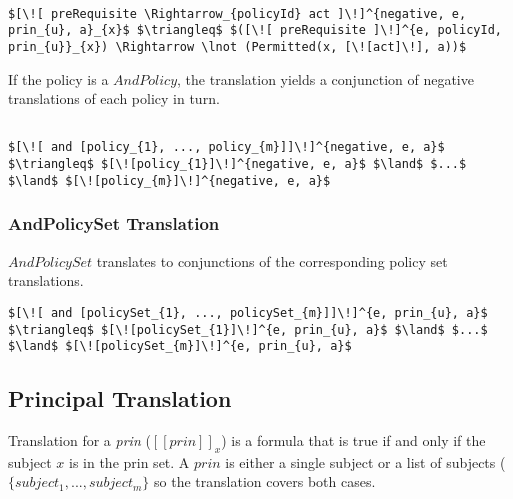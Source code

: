 \lstset{mathescape, language=AST}  
\begin{lstlisting}[frame=single, caption={Negative Policy Translation {$\colon$} Single policy},label={lst:transpolicynegativeSingle}]

$[\![ preRequisite \Rightarrow_{policyId} act ]\!]^{negative, e, prin_{u}, a}_{x}$ $\triangleq$ $([\![ preRequisite ]\!]^{e, policyId, prin_{u}}_{x}) \Rightarrow \lnot (Permitted(x, [\![act]\!], a))$
\end{lstlisting}

If the policy is a $AndPolicy$, the translation yields a conjunction of negative translations of each policy in turn.

\lstset{mathescape, language=AST}  
\begin{lstlisting}[frame=single, caption={Negative Policy Translation {$\colon$} List of policies},label={lst:transpolicynegativeListOfPolicies}]

$[\![ and [policy_{1}, ..., policy_{m}]]\!]^{negative, e, a}$ $\triangleq$ $[\![policy_{1}]\!]^{negative, e, a}$ $\land$ $...$ $\land$ $[\![policy_{m}]\!]^{negative, e, a}$

\end{lstlisting}

\subsubsection{AndPolicySet Translation}
$AndPolicySet$ translates to conjunctions of the corresponding policy set translations. 

\lstset{mathescape, language=AST}  
\begin{lstlisting}[frame=single, caption={Policy Set Translation {$\colon$} AndPolicySet},label={lst:transpolicyformulaAndPolicySet}]
$[\![ and [policySet_{1}, ..., policySet_{m}]]\!]^{e, prin_{u}, a}$ $\triangleq$ $[\![policySet_{1}]\!]^{e, prin_{u}, a}$ $\land$ $...$ $\land$ $[\![policySet_{m}]\!]^{e, prin_{u}, a}$

\end{lstlisting}

\subsection{Principal Translation}
Translation for a \emph{prin} ($[\![ prin ]\!]_{x}$) is a formula that is true if and only if the subject $x$ is in the prin set. A $prin$ is either a single subject or a list of subjects ($\{ subject_{1}, ..., subject_{m} \}$ so the translation covers both cases. 


